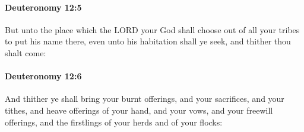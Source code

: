 		\paragraph{Deuteronomy 12:5} %
			\label{DEUTERONOMY-12-5}

			But unto the place which the LORD your God shall choose out of all your tribes to put his name there, even unto his habitation shall ye seek, and thither thou shalt come:


		\paragraph{Deuteronomy 12:6} %
			\label{DEUTERONOMY-12-6}

			And thither ye shall bring your burnt offerings, and your sacrifices, and your tithes, and heave offerings of your hand, and your vows, and your freewill offerings, and the firstlings of your herds and of your flocks:

